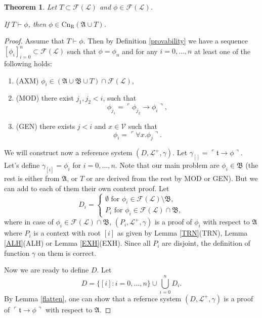 \documentclass[10pt]{article}
\theoremstyle{plain}
\newtheorem{theorem}{Theorem}[section]
\newcommand{\F}{\mathcal{F}}
\newcommand{\truth}{\mathfrak{t}}
\newcommand{\Cnr}{\text{Cn}_\text{R}}
\renewcommand{\L}{\mathscr{L}}
\newcommand{\V}{\mathscr{V}}
\newcommand{\prove}{\vdash}
\begin{document}
\begin{theorem}
\label{semantic-completness}
Let $T\subset \F(\L)$ and $\phi\in\F(\L)$. 

If $T\prove\phi$, then $\phi\in\Cnr(\mathfrak{A}\cup T)$.
\end{theorem}
\begin{proof}
Assume that $T\prove \phi$. Then by Definition \ref{provability} we have a sequence 
$[\phi_i]_{i=0}^n \subset \F(\L)$ such that $\phi = \phi_n$ and for any $i=0, \dots, n$ at least one of the following holds:
\begin{enumerate}
\item (AXM) $\phi_i \in (\mathfrak{A} \cup \mathfrak{B} \cup T) \cap\F(\L)$,
\item (MOD) there exist $j_1, j_2 < i$, such that
\begin{equation}
\phi_{j_1} = \ulcorner \phi_{j_2} \to \phi_i \urcorner,
\end{equation}
\item (GEN) there exists $j < i$ and $x\in \V$ such that
\begin{equation}
\phi_i = \ulcorner \forall x. \phi_j \urcorner.
\end{equation}
\end{enumerate}

We will construct now a reference system $(D, \L^+, \gamma)$.
Let $\gamma_{[]} = \ulcorner \truth\to\phi \urcorner$.
Let's define $\gamma_{[i]} = \phi_i$ for $i=0, \dots, n$.
Note that our main problem are $\phi_i\in\mathfrak{B}$ (the rest is either from $\mathfrak{A}$, or $T$ or are derived from the rest by MOD or GEN). But we can add to each of them their own context proof.
Let
\begin{equation}
D_i =
\begin{cases}
\emptyset \text{ for } \phi_i \in \F(\L)\setminus \mathfrak{B},\\
P_i \text{ for } \phi_i\in \F(\L) \cap \mathfrak{B},
\end{cases}
\end{equation}
where in case of $\phi_i\in \F(\L) \cap \mathfrak{B}$, $(P_i, \L^+, \gamma)$ is a proof of $\phi_i$ with respect to $\mathfrak{A}$ where $P_i$ is a context with root $[i]$ as given by Lemma \ref{TRN}(TRN), Lemma \ref{ALH}(ALH) or Lemma \ref{EXH}(EXH).
Since all $P_i$ are disjoint, the definition of function $\gamma$ on them is correct. 

Now we are ready to define $D$. Let
\begin{equation}
D = \{[i]: i = 0, \dots, n\} \cup \bigcup_{i=0}^n D_i.
\end{equation}
By Lemma \ref{flatten}, one can show that a refernce system $(D, \L^+, \gamma)$ is a proof of $\ulcorner \truth\to\phi \urcorner$ with respect to $\mathfrak{A}$.
\end{proof}
\end{document}

